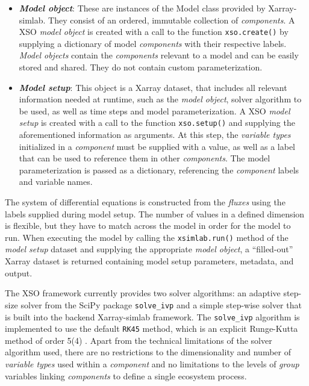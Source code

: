 \documentclass[gmd, manuscript]{copernicus}
\begin{document}
\begin{itemize}
    \item \textbf{\textit{Model object}}: These are instances of the Model class provided by Xarray-simlab. They consist of an ordered, immutable collection of \textit{components}. A XSO \textit{model object} is created with a call to the function \texttt{xso.create()} by supplying a dictionary of model \textit{components} with their respective labels. \textit{Model objects} contain the \textit{components} relevant to a model and can be easily stored and shared. They do not contain custom parameterization.

   \item \textbf{\textit{Model setup}}: This object is a Xarray dataset, that includes all relevant information needed at runtime, such as the \textit{model object}, solver algorithm to be used, as well as time steps and model parameterization. A XSO \textit{model setup} is created with a call to the function \texttt{xso.setup()} and supplying the aforementioned information as arguments. At this step, the \textit{variable types} initialized in a \textit{component} must be supplied with a value, as well as a label that can be used to reference them in other \textit{components}. The model parameterization is passed as a dictionary, referencing the \textit{component} labels and variable names.
\end{itemize}

The system of differential equations is constructed from the \textit{fluxes} using the labels supplied during model setup. The number of values in a defined dimension is flexible, but they have to match across the model in order for the model to run. When executing the model by calling the \texttt{xsimlab.run()} method of the \textit{model setup} dataset and supplying the appropriate \textit{model object}, a “filled-out” Xarray dataset is returned containing model setup parameters, metadata, and output.

The XSO framework currently provides two solver algorithms: an adaptive step-size solver from the SciPy package \texttt{solve\_ivp} \citep{Virtanen2020SciPyPython} and a simple step-wise solver that is built into the backend Xarray-simlab framework. The \texttt{solve\_ivp} algorithm is implemented to use the default \texttt{RK45} method, which is an explicit Runge-Kutta method of order 5(4) \citep{Dormand1980AFormulae}. Apart from the technical limitations of the solver algorithm used, there are no restrictions to the dimensionality and number of \textit{variable types} used within a \textit{component} and no limitations to the levels of \textit{group} variables linking \textit{components} to define a single ecosystem process. 
\end{document}
